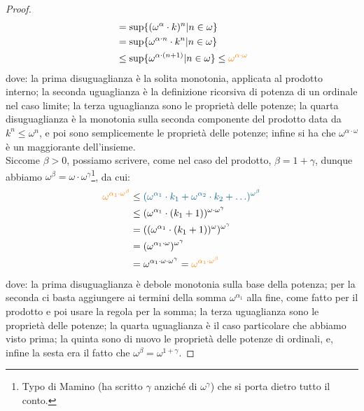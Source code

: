 \begin{proof}
\[\begin{split}
														 &= \sup\{(\omega^\alpha \cdot k)^n | n \in \omega\} \\
														 &= \sup\{\omega^{\alpha \cdot n}\cdot k^n | n \in \omega\} \\
														 &\leq \sup\{\omega^{\alpha \cdot (n + 1)} | n \in \omega\} \leq \textcolor{orange}{\omega^{\alpha \cdot \omega}}
	\end{split}
		\]
	dove: la prima disuguaglianza \`e la solita monotonia, applicata al prodotto interno; la seconda uguaglianza \`e la definizione ricorsiva di potenza di un ordinale nel caso limite;
	la terza uguaglianza sono le propriet\`a delle potenze;
	la quarta disuguaglianza \`e la monotonia sulla seconda componente del prodotto data da $k^n \leq \omega^n$, e poi sono semplicemente le propriet\`a delle potenze;
	infine si ha che $\omega^{\alpha \cdot \omega}$ \`e un maggiorante dell'insieme.\\
	Siccome $\beta > 0$, possiamo scrivere, come nel caso del prodotto, $\beta = 1 + \gamma$, dunque abbiamo $\omega^\beta = \omega \cdot \omega^\gamma$\footnote{Typo di Mamino (ha scritto $\gamma$ anzich\'e di $\omega^\gamma$) che si porta dietro tutto il conto.}, da cui:
	\[ \begin{split}
		\textcolor{orange}{\omega^{\alpha_1 \cdot \omega^\beta}} &\leq \textcolor{MidnightBlue}{(\omega^{\alpha_1} \cdot k_1 + \omega^{\alpha_2} \cdot k_2 + \ldots)^{\omega^\beta}} \\
															   &\leq (\omega^{\alpha_1} \cdot (k_1 + 1))^{\omega\cdot \omega^{\gamma}} \\
															   &= ((\omega^{\alpha_1} \cdot (k_1 + 1))^{\omega})^{\omega^{\gamma}} \\
															   &= (\omega^{\alpha_1 \cdot \omega})^{\omega^\gamma} \\
															   &= \omega^{\alpha_1 \cdot \omega \cdot \omega^\gamma} = \textcolor{orange}{\omega^{\alpha_1 \cdot \omega^\beta}}
	\end{split}
		\]
	dove: la prima disuguaglianza \`e debole monotonia sulla base della potenza; per la seconda ci basta aggiungere ai termini della somma $\omega^{\alpha_1}$ alla fine, come fatto per il prodotto e poi usare la regola per la somma;
	la terza uguaglianza sono le propriet\`a delle potenze; la quarta uguaglianza \`e il caso particolare che abbiamo visto prima; la quinta sono di nuovo le propriet\`a delle potenze di ordinali, e, infine la sesta era il fatto che $\omega^\beta = \omega^{1 + \gamma}$.
\end{proof}

